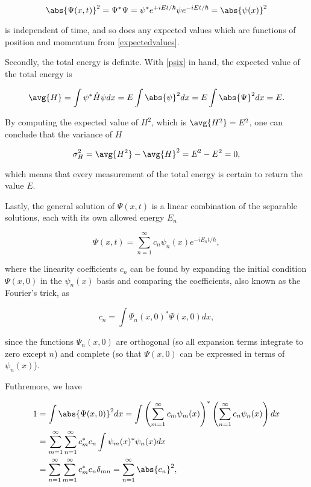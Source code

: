 \documentclass[a4paper,12pt]{report}
\begin{document}
\begin{equation}
  \abs{\Psi (x,t)}^2 = \Psi ^*\Psi = \psi ^* e^{+iEt /\hbar  }\psi e^{-iEt /\hbar  } = \abs{\psi (x)}^2
\end{equation}

is independent of time, and so does any expected values which are functions of position and momentum from \cref{expectedvalues}.

Secondly, the total energy is definite. With \cref{psix} in hand, the expected value of the total energy is 

\begin{equation}
  \avg{H} = \int \psi ^* \hat{H} \psi dx = E \int \abs{\psi }^2 dx = E \int \abs{\Psi }^2 dx = E.  
\end{equation}

By computing the expected value of \(H^2\), which is \(\avg{H^2} = E^2 \), one can conclude that the variance of \(H\)

\begin{equation}
  \sigma _{H}^2 = \avg{H^2} - \avg{H}^2 = E^2- E^2 = 0,
\end{equation}

which means that every measurement of the total energy is certain to return the value \(E\).

Lastly, the general solution of \(\Psi (x,t)\) is a linear combination of the separable solutions, each with its own allowed energy \(E_{n} \) 

\begin{equation}
  \Psi (x,t) = \sum_{n=1}^{\infty} c_{n}\psi _{n}(x) e^{-iE_{n}t /\hbar   }, \label{Psix} 
\end{equation}

where the linearity coefficients \(c_{n} \) can be found by expanding the initial condition \(\Psi (x,0)\) in the \(\psi _{n}(x) \) basis and comparing the coefficients, also known as the Fourier's trick, as

\begin{equation}
  c_{n} = \int \Psi _{n}(x,0)^* \Psi (x,0) dx,  
\end{equation}

since the functions \(\Psi _{n}(x,0) \) are orthogonal (so all expansion terms integrate to zero except \(n\)) and complete (so that \(\Psi (x,0)\) can be expressed in terms of \(\psi _{n}(x) \)).

Futhremore, we have

\begin{equation}
  \begin{aligned}
    1 &= \int \abs{\Psi (x,0)}^2dx = \int \left( \sum_{m=1}^{\infty}c_{m}\psi _{m}(x)\right)^*\left( \sum_{n=1}^{\infty}c_{n}\psi _{n}(x)\right) dx \\ &= \sum_{m=1}^{\infty}\sum_{n=1}^{\infty}c_{m}^*c_{n}\int \psi _{m}(x)^*\psi _{n}(x)dx \\ &= \sum_{n=1}^{\infty}\sum_{m=1}^{\infty}c_{m}^*c_{n}\delta _{mn}= \sum_{n=1}^{\infty}\abs{c_{n} }^2,       
  \end{aligned}
\end{equation}
\end{document}
